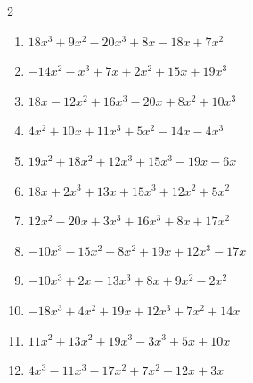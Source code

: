 \documentclass[11pt]{article}
\begin{document}
\begin{multicols}{2}
\begin{enumerate}
  \vspace{1.1cm}
  \item $18x^{3} + 9x^{2} - 20x^{3} + 8x - 18x + 7x^{2}$
  \vspace{1.1cm}
  \item $-14x^{2} - x^{3} + 7x + 2x^{2} + 15x + 19x^{3}$
  \vspace{1.1cm}
  \item $18x - 12x^{2} + 16x^{3} - 20x + 8x^{2} + 10x^{3}$
  \vspace{1.1cm}
  \item $4x^{2} + 10x + 11x^{3} + 5x^{2} - 14x - 4x^{3}$
  \vspace{1.1cm}
  \item $19x^{2} + 18x^{2} + 12x^{3} + 15x^{3} - 19x - 6x$
  \vspace{1.1cm}
  \item $18x + 2x^{3} + 13x + 15x^{3} + 12x^{2} + 5x^{2}$
  \vspace{1.1cm}
  \item $12x^{2} - 20x + 3x^{3} + 16x^{3} + 8x + 17x^{2}$
  \vspace{1.1cm}
  \item $-10x^{3} - 15x^{2} + 8x^{2} + 19x + 12x^{3} - 17x$
  \vspace{1.1cm}
  \item $-10x^{3} + 2x - 13x^{3} + 8x + 9x^{2} - 2x^{2}$
  \vspace{1.1cm}
  \item $-18x^{3} + 4x^{2} + 19x + 12x^{3} + 7x^{2} + 14x$
  \vspace{1.1cm}
  \item $11x^{2} + 13x^{2} + 19x^{3} - 3x^{3} + 5x + 10x$
  \vspace{1.1cm}
  \item $4x^{3} - 11x^{3} - 17x^{2} + 7x^{2} - 12x + 3x$
  \vspace{1.1cm}
\end{enumerate}
\end{multicols}
\end{document}

